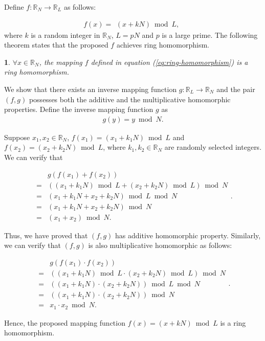 \documentclass[english,draftcls,onecolumn,11pt]{IEEEtran}
\theoremstyle{definition}
\theoremstyle{plain}
\newtheorem{thm}{\protect\theoremname}
\theoremstyle{plain}
\theoremstyle{definition}
\providecommand{\theoremname}{Theorem}
\begin{document}
Define $f:\mathbb{R}_{N}\to\mathbb{R}_{L}$ as follows:

\begin{equation}
f(x)=\begin{array}{c}
(x+kN)\bmod L,\end{array}\label{eq:ring-homomorphism}
\end{equation}
where $k$ is a random integer in $\mathbb{R}_{N}$, $L=pN$ and $p$
is a large prime. The following theorem states that the proposed $f$
achieves ring homomorphism.
\begin{thm}
\label{thm:ring-homo}$\forall x\in\mathbb{R}_{N}$, the mapping $f$
defined in equation (\ref{eq:ring-homomorphism}) is a ring homomorphism.\end{thm}
\begin{IEEEproof}
We show that there exists an inverse mapping function $g:\mathbb{R}_{L}\to\mathbb{R}_{N}$
and the pair $(f,g)$ possesses both the additive and the multiplicative
homomorphic properties. Define the inverse mapping function $g$ as
\[
\begin{array}{c}
g(y)=y\bmod N.\end{array}
\]


Suppose $x_{1},x_{2}\in\mathbb{R}_{N}$, $f(x_{1})=(x_{1}+k_{1}N)\bmod L$
and $f(x_{2})=(x_{2}+k_{2}N)\bmod L$, where $k_{1},k_{2}\in\mathbb{R}_{N}$
are randomly selected integers. We can verify that 

\[
\begin{array}{cl}
 & g(f(x_{1})+f(x_{2}))\\
= & ((x_{1}+k_{1}N)\bmod L+(x_{2}+k_{2}N)\bmod L)\bmod N\\
= & (x_{1}+k_{1}N+x_{2}+k_{2}N)\bmod L\bmod N\\
= & (x_{1}+k_{1}N+x_{2}+k_{2}N)\bmod N\\
= & (x_{1}+x_{2})\bmod N.
\end{array}.
\]


Thus, we have proved that $(f,g)$ has additive homomorphic property.
Similarly, we can verify that $(f,g)$ is also multiplicative homomorphic
as follows:

\[
\begin{array}{cl}
 & g(f(x_{1})\cdot f(x_{2}))\\
= & ((x_{1}+k_{1}N)\bmod L\cdot(x_{2}+k_{2}N)\bmod L)\bmod N\\
= & ((x_{1}+k_{1}N)\cdot(x_{2}+k_{2}N))\bmod L\bmod N\\
= & ((x_{1}+k_{1}N)\cdot(x_{2}+k_{2}N))\bmod N\\
= & x_{1}\cdot x_{2}\bmod N.
\end{array}.
\]


Hence, the proposed mapping function $f(x)=(x+kN)\bmod L$ is a ring
homomorphism.
\end{IEEEproof}
\end{document}
